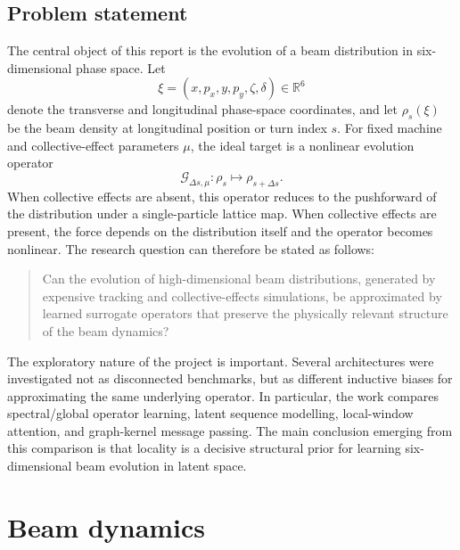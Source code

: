 \documentclass[11pt,a4paper]{article}
\begin{document}
\begin{sloppypar}
\subsection{Problem statement}
The central object of this report is the evolution of a beam distribution in six-dimensional phase space. Let
\begin{equation}
    \xi=(x,p_x,y,p_y,\zeta,\delta)\in\mathbb{R}^{6}
\end{equation}
denote the transverse and longitudinal phase-space coordinates, and let $\rho_s(\xi)$ be the beam density at longitudinal position or turn index $s$. For fixed machine and collective-effect parameters $\mu$, the ideal target is a nonlinear evolution operator
\begin{equation}
    \mathcal{G}_{\Delta s,\mu}: \rho_s \mapsto \rho_{s+\Delta s}.
    \label{eq:intro_operator_target}
\end{equation}
When collective effects are absent, this operator reduces to the pushforward of the distribution under a single-particle lattice map. When collective effects are present, the force depends on the distribution itself and the operator becomes nonlinear. The research question can therefore be stated as follows:

\begin{quote}
Can the evolution of high-dimensional beam distributions, generated by expensive tracking and collective-effects simulations, be approximated by learned surrogate operators that preserve the physically relevant structure of the beam dynamics?
\end{quote}

The exploratory nature of the project is important. Several architectures were investigated not as disconnected benchmarks, but as different inductive biases for approximating the same underlying operator. In particular, the work compares spectral/global operator learning, latent sequence modelling, local-window attention, and graph-kernel message passing. The main conclusion emerging from this comparison is that locality is a decisive structural prior for learning six-dimensional beam evolution in latent space.



\section{Beam dynamics}
\label{sec:beam_dynamics_data}


\end{sloppypar}
\end{document}
